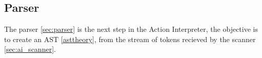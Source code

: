 \subsection{Parser}
The parser \ref{sec:parser} is the next step in the Action Interpreter, the objective is to create an AST \ref{asttheory}, from the stream of tokens recieved by the scanner \ref{sec:ai_scanner}.